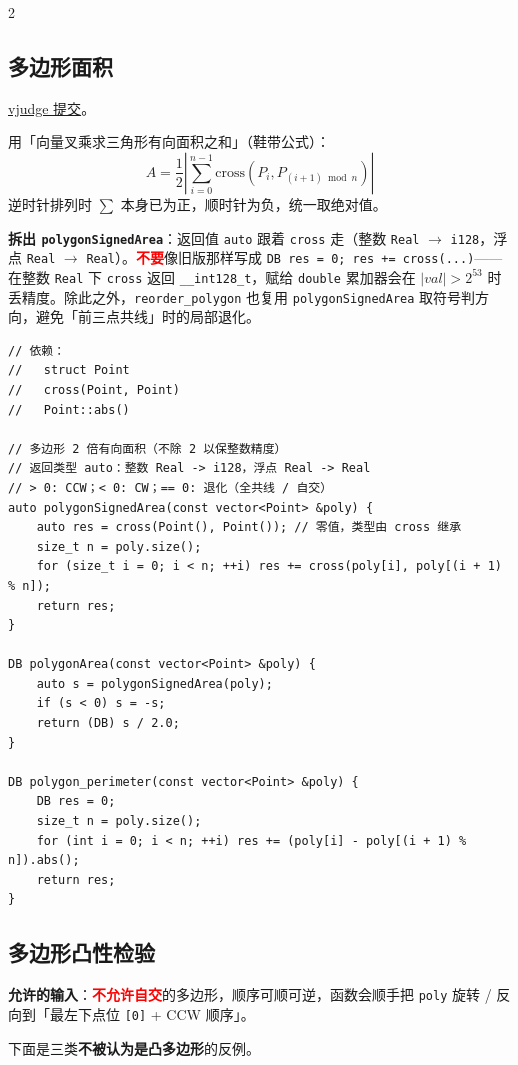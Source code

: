 \begin{multicols*}{2}
		\subsection{多边形面积}

		\href{https://vjudge.net/solution/64207564}{vjudge 提交}。

		用「向量叉乘求三角形有向面积之和」（鞋带公式）：
		$$
		A = \frac{1}{2} \left| \sum_{i=0}^{n-1} \mathrm{cross}(P_i, P_{(i+1) \bmod n}) \right|
		$$
		逆时针排列时 $\sum$ 本身已为正，顺时针为负，统一取绝对值。

		\textbf{拆出 \texttt{polygonSignedArea}}：返回值 \texttt{auto} 跟着 \texttt{cross} 走（整数 \texttt{Real} $\to$ \texttt{i128}，浮点 \texttt{Real} $\to$ \texttt{Real}）。\textcolor{red}{\textbf{不要}}像旧版那样写成 \texttt{DB res = 0; res += cross(...)}——在整数 \texttt{Real} 下 \texttt{cross} 返回 \texttt{\_\_int128\_t}，赋给 \texttt{double} 累加器会在 $|val| > 2^{53}$ 时丢精度。除此之外，\texttt{reorder\_polygon} 也复用 \texttt{polygonSignedArea} 取符号判方向，避免「前三点共线」时的局部退化。

		\begin{verbatim}
// 依赖：
//   struct Point
//   cross(Point, Point)
//   Point::abs()

// 多边形 2 倍有向面积（不除 2 以保整数精度）
// 返回类型 auto：整数 Real -> i128，浮点 Real -> Real
// > 0: CCW；< 0: CW；== 0: 退化（全共线 / 自交）
auto polygonSignedArea(const vector<Point> &poly) {
	auto res = cross(Point(), Point()); // 零值，类型由 cross 继承
	size_t n = poly.size();
	for (size_t i = 0; i < n; ++i) res += cross(poly[i], poly[(i + 1) % n]);
	return res;
}

DB polygonArea(const vector<Point> &poly) {
	auto s = polygonSignedArea(poly);
	if (s < 0) s = -s;
	return (DB) s / 2.0;
}

DB polygon_perimeter(const vector<Point> &poly) {
	DB res = 0;
	size_t n = poly.size();
	for (int i = 0; i < n; ++i) res += (poly[i] - poly[(i + 1) % n]).abs();
	return res;
}
		\end{verbatim}

		\subsection{多边形凸性检验}

		\textbf{允许的输入}：\textcolor{red}{\textbf{不允许自交}}的多边形，顺序可顺可逆，函数会顺手把 \texttt{poly} 旋转 / 反向到「最左下点位 \texttt{[0]} + CCW 顺序」。

		下面是三类\textbf{不被认为是凸多边形}的反例。


\end{multicols*}
